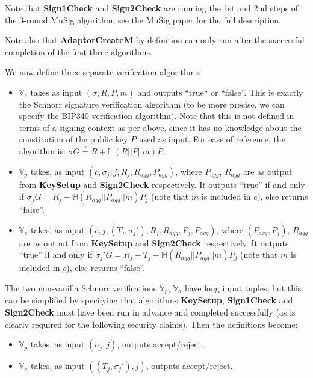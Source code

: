 \documentclass[10pt,a4paper]{article}
\begin{document}
Note that \textbf{Sign1Check} and \textbf{Sign2Check} are running the 1st and 2nd steps of the 3-round MuSig algorithm; see the MuSig paper for the full description.

\vspace{5 pt}

Note also that \textbf{AdaptorCreateM} by definition can only run after the successful completion of the first three algorithms.

\vspace{5 pt}

We now define three separate verification algorithms:

\begin{itemize}
\item $\mathbb{V}_s$ takes as input $(\sigma, R, P, m)$ and outputs ``true`` or ``false''. This is exactly the Schnorr signature verification algorithm (to be more precise, we can specify the BIP340 verification algorithm). Note that this is not defined in terms of a signing context as per above, since it has no knowledge about the constitution of the public key $P$ used as input. For ease of reference, the algorithm is: $ \sigma G \stackrel{?}{=} R + \mathbb{H}(R || P || m)P$.
\item $\mathbb{V}_p$ takes, as input $(c, \sigma_j, j, R_j, R_{agg}, P_{agg})$, where $P_{agg}$, $R_{agg}$ are as output from \textbf{KeySetup} and \textbf{Sign2Check} respectively. It outputs ``true'' if and only if $\sigma_j G = R_j + \mathbb{H}(R_{agg}||P_{agg}||m)P_j$ (note that $m$ is included in $c$), else returns ``false''.
\item $\mathbb{V}_a$ takes, as input $(c, j, (T_j, \sigma_j'), R_j, R_{agg}, P_j, P_{agg})$, where $(P_{agg}, P_j)$, $R_{agg}$ are as output from \textbf{KeySetup} and \textbf{Sign2Check} respectively. It outputs ``true'' if and only if $\sigma_j' G = R_j - T_j + \mathbb{H}(R_{agg}||P_{agg}||m)P_j$ (note that $m$ is included in $c$), else returns ``false''.
\end{itemize}

The two non-vanilla Schnorr verifications $\mathbb{V}_p$, $\mathbb{V}_a$ have long input tuples, but this can be simplified by specifying that algorithms \textbf{KeySetup}, \textbf{Sign1Check} and \textbf{Sign2Check} must have been run in advance and completed successfully (as is clearly required for the following security claims). Then the definitions become:

\begin{itemize}
\item $\mathbb{V}_p$ takes, as input $(\sigma_j, j)$, outputs accept/reject.
\item $\mathbb{V}_a$ takes, as input $((T_j, \sigma_j'), j)$, outputs accept/reject. 
\end{itemize}
\end{document}
